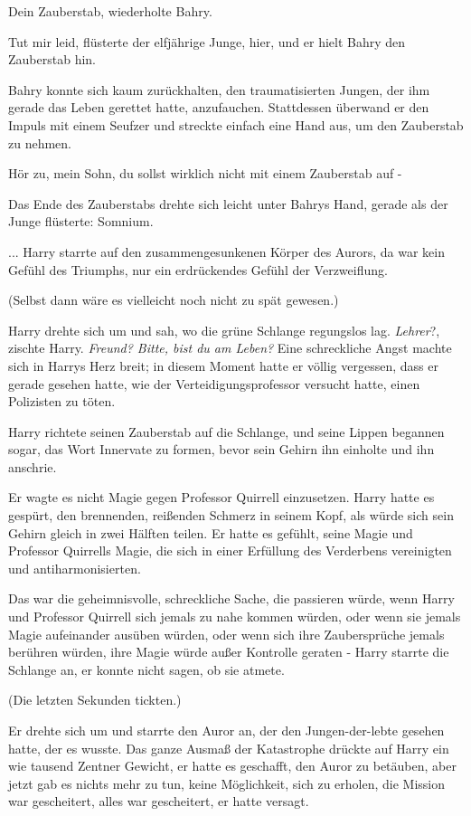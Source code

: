 \glqq{}Dein Zauberstab\grqq{}, wiederholte Bahry.

\glqq{}Tut mir leid\grqq{}, flüsterte der elfjährige Junge, \glqq{}hier\grqq{},
und er hielt Bahry den Zauberstab hin.

Bahry konnte sich kaum zurückhalten, den traumatisierten Jungen, der ihm gerade
das Leben gerettet hatte, anzufauchen. Stattdessen überwand er den Impuls mit
einem Seufzer und streckte einfach eine Hand aus, um den Zauberstab zu nehmen.

\glqq{}Hör zu, mein Sohn, du sollst wirklich nicht mit einem Zauberstab auf -\grqq{}

Das Ende des Zauberstabs drehte sich leicht unter Bahrys Hand, gerade als der
Junge flüsterte: \glqq{}Somnium.\grqq{}

... Harry starrte auf den zusammengesunkenen Körper des Aurors, da war kein
Gefühl des Triumphs, nur ein erdrückendes Gefühl der Verzweiflung.

(Selbst dann wäre es vielleicht noch nicht zu spät gewesen.)

Harry drehte sich um und sah, wo die grüne Schlange regungslos lag. \glqq{}
\emph{Lehrer}?\grqq{}, zischte Harry. \glqq{}\emph{Freund? Bitte, bist du am
Leben?}\grqq{} Eine schreckliche Angst machte sich in Harrys Herz breit; in diesem
Moment hatte er völlig vergessen, dass er gerade gesehen hatte, wie der
Verteidigungsprofessor versucht hatte, einen Polizisten zu töten.

Harry richtete seinen Zauberstab auf die Schlange, und seine Lippen begannen
sogar, das Wort Innervate zu formen, bevor sein Gehirn ihn einholte und ihn
anschrie.

Er wagte es nicht Magie gegen Professor Quirrell einzusetzen. Harry hatte es
gespürt, den brennenden, reißenden Schmerz in seinem Kopf, als würde sich sein
Gehirn gleich in zwei Hälften teilen. Er hatte es gefühlt, seine Magie und
Professor Quirrells Magie, die sich in einer Erfüllung des Verderbens
vereinigten und antiharmonisierten.

Das war die geheimnisvolle, schreckliche Sache, die passieren würde, wenn Harry
und Professor Quirrell sich jemals zu nahe kommen würden, oder wenn sie jemals
Magie aufeinander ausüben würden, oder wenn sich ihre Zaubersprüche jemals
berühren würden, ihre Magie würde außer Kontrolle geraten - Harry starrte die
Schlange an, er konnte nicht sagen, ob sie atmete.

(Die letzten Sekunden tickten.)

Er drehte sich um und starrte den Auror an, der den Jungen-der-lebte gesehen
hatte, der es wusste. Das ganze Ausmaß der Katastrophe drückte auf Harry ein wie
tausend Zentner Gewicht, er hatte es geschafft, den Auror zu betäuben, aber
jetzt gab es nichts mehr zu tun, keine Möglichkeit, sich zu erholen, die Mission
war gescheitert, alles war gescheitert, er hatte versagt.

